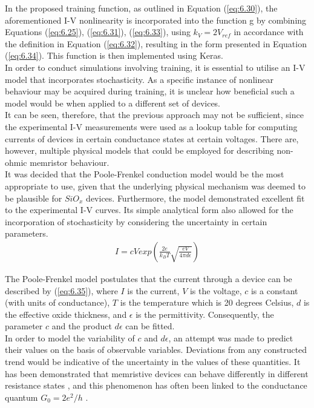 \noindent In the proposed training function, as outlined in Equation (\ref{eq:6.30}), the aforementioned I-V nonlinearity is incorporated into the function g by combining Equations (\ref{eq:6.25}), (\ref{eq:6.31}), (\ref{eq:6.33}), using $k_V = 2V_{ref}$ in accordance with the definition in Equation (\ref{eq:6.32}), resulting in the form presented in Equation (\ref{eq:6.34}). This function is then implemented using Keras.\\

\noindent In order to conduct simulations involving training, it is essential to utilise an I-V model that incorporates stochasticity. As a specific instance of nonlinear behaviour may be acquired during training, it is unclear how beneficial such a model would be when applied to a different set of devices. \\

\noindent It can be seen, therefore, that the previous approach may not be sufficient, since the experimental I-V measurements were used as a lookup table for computing currents of devices in certain conductance states at certain voltages. There are, however, multiple physical models that could be employed for describing non-ohmic memristor behaviour. \\

\noindent It was decided that the Poole-Frenkel conduction model \cite{joksas2022nonideality} would be the most appropriate to use, given that the underlying physical mechanism was deemed to be plausible for $SiO_x$ devices. Furthermore, the model demonstrated excellent fit to the experimental I-V curves. Its simple analytical form also allowed for the incorporation of stochasticity by considering the uncertainty in certain parameters.
\begin{align}
I = cV exp\left( \frac{2e}{k_BT} \sqrt{\frac{eV}{4\pi d\epsilon}} \right) \label{eq:6.35}
\end{align}

\noindent The Poole-Frenkel model postulates that the current through a device can be described by (\ref{eq:6.35}), where $I$ is the current, $V$ is the voltage, $c$ is a constant (with units of conductance), $T$ is the temperature which is 20 degrees Celsius, $d$ is the effective oxide thickness, and $\epsilon$ is the permittivity. Consequently, the parameter $c$ and the product $d\epsilon$ can be fitted.\\

\noindent In order to model the variability of $c$ and $d\epsilon$, an attempt was made to predict their values on the basis of observable variables. Deviations from any constructed trend would be indicative of the uncertainty in the values of these quantities. It has been demonstrated that memristive devices can behave differently in different resistance states \cite{mehonic2015structural}, and this phenomenon has often been linked to the conductance quantum $G_0 = 2e^2/h$ \cite{yi2016quantized}.\\

